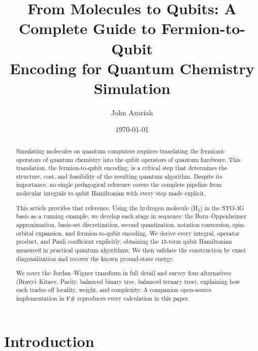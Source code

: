 \documentclass[aps,prb,preprint,longbibliography,nofootinbib]{revtex4-2}
\begin{document}
\title{From Molecules to Qubits: A Complete Guide to Fermion-to-Qubit\\
  Encoding for Quantum Chemistry Simulation}

\author{John Azariah}

\date{\today}

\begin{abstract}
Simulating molecules on quantum computers requires translating the
fermionic operators of quantum chemistry into the qubit operators of
quantum hardware.  This translation, the fermion-to-qubit
encoding, is a critical step that determines the structure, cost, and
feasibility of the resulting quantum algorithm.  Despite its importance,
no single pedagogical reference covers the complete pipeline from
molecular integrals to qubit Hamiltonian with every step made explicit.

This article provides that reference.  Using the hydrogen molecule
(H$_2$) in the STO-3G basis as a running example, we develop each stage
in sequence: the Born--Oppenheimer approximation, basis-set
discretization, second quantization, notation conversion, spin-orbital
expansion, and fermion-to-qubit encoding.  We derive every integral,
operator product, and Pauli coefficient explicitly, obtaining the
15-term qubit Hamiltonian measured in practical quantum algorithms.  We
then validate the construction by exact diagonalization and recover the
known ground-state energy.

We cover the Jordan--Wigner transform in full detail and survey four
alternatives (Bravyi--Kitaev, Parity, balanced binary tree, balanced
ternary tree), explaining how each trades off locality, weight, and
complexity.  A companion open-source implementation in F\# reproduces
every calculation in this paper.
\end{abstract}

\maketitle

\section{Introduction}
\label{sec:introduction}
\end{document}
